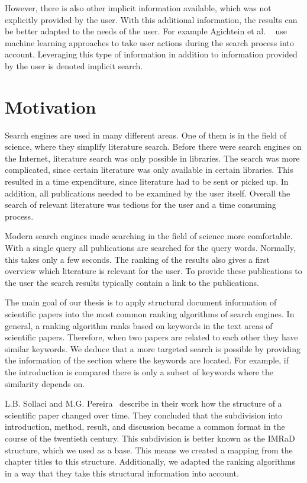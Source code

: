 However, there is also other implicit information available, which was not explicitly provided by the user. With this additional information, the results can be better adapted to the needs of the user. For example Agichtein et al. ~\cite{agichtein2006improving} use machine learning approaches to take user actions during the search process into account. Leveraging this type of information in addition to information provided by the user is denoted implicit search.


\section{Motivation}
\label{sec:Motivation}

Search engines are used in many different areas. One of them is in the field of science, where they simplify literature search. Before there were search engines on the Internet, literature search was only possible in libraries. The search was more complicated, since certain literature was only available in certain libraries. This resulted in a time expenditure, since literature had to be sent or picked up. In addition, all publications needed to be examined by the user itself. Overall the search of relevant literature was tedious for the user and a time consuming process.

Modern search engines made searching in the field of science more comfortable. With a single query all publications are searched for the query words. Normally, this takes only a few seconds. The ranking of the results also gives a first overview which literature is relevant for the user. To provide these publications to the user the search results typically contain a link to the publications.

The main goal of our thesis is to apply structural document information of scientific papers into the most common ranking algorithms of search engines. In general, a ranking algorithm ranks based on keywords in the text areas of scientific papers. Therefore, when two papers are related to each other they have similar keywords. We deduce that a more targeted search is possible by providing the information of the section where the keywords are located. For example, if the introduction is compared there is only a subset of keywords where the similarity depends on.

 L.B. Sollaci and M.G. Pereira~\cite{Sollaci-The-2004} describe in their work how the structure of a scientific paper changed over time. They concluded that the subdivision into introduction, method, result, and discussion became a common format in the course of the twentieth century. This subdivision is better known as the IMRaD structure, which we used as a base. This means we created a mapping from the chapter titles to this structure. Additionally, we adapted the ranking algorithms in a way that they take this structural information into account.

